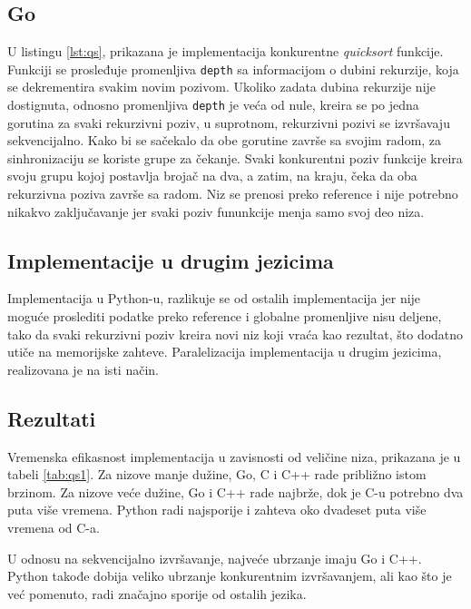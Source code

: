 \documentclass[12pt,oneside]{memoir}
\begin{document}
\subsection{Go}
\label{qs:go}
U listingu \ref{lst:qs}, prikazana je implementacija  konkurentne \textit{quicksort} funkcije. Funkciji se prosleđuje promenljiva \texttt{depth} sa informacijom o dubini rekurzije, koja se dekrementira svakim novim pozivom. Ukoliko zadata dubina rekurzije nije dostignuta, odnosno promenljiva \texttt{depth} je veća od nule, kreira se po jedna gorutina za svaki rekurzivni poziv, u suprotnom, rekurzivni pozivi se izvršavaju sekvencijalno. Kako bi se sačekalo da obe gorutine završe sa svojim radom, za sinhronizaciju se koriste grupe za čekanje. Svaki konkurentni poziv funkcije kreira svoju grupu kojoj postavlja brojač na dva, a zatim, na kraju, čeka da oba rekurzivna poziva završe sa radom. Niz se prenosi preko reference i nije potrebno nikakvo zaključavanje jer svaki poziv fununkcije menja samo svoj deo niza.

\subsection{Implementacije u drugim jezicima}
Implementacija u Python-u, razlikuje se od ostalih implementacija jer nije moguće proslediti podatke preko reference i globalne promenljive nisu deljene, tako da svaki rekurzivni poziv kreira novi niz koji vraća kao rezultat, što dodatno utiče na memorijske zahteve. Paralelizacija implementacija u drugim jezicima, realizovana je na isti način. 

\subsection{Rezultati}\label{qs:rez}

Vremenska efikasnost implementacija u zavisnosti od veličine niza, prikazana je u tabeli \ref{tab:qs1}. Za nizove manje dužine, Go, C i C++ rade približno istom brzinom. Za nizove veće dužine, Go i C++ rade najbrže, dok je C-u potrebno dva puta više vremena. Python radi najsporije i zahteva oko dvadeset puta više vremena od C-a. 

U odnosu na sekvencijalno izvršavanje, najveće ubrzanje imaju Go i C++. Python takođe dobija veliko ubrzanje konkurentnim izvršavanjem, ali kao što je već pomenuto, radi značajno sporije od ostalih jezika. 
\end{document}
